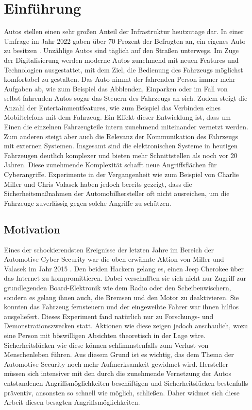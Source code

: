 \chapter{Einführung}

Autos stellen einen sehr großen Anteil der Infrastruktur heutzutage dar. In einer Umfrage im Jahr 2022 gaben über 70 Prozent der Befragten an, ein eigenes Auto zu besitzen \cite[vgl.][]{Statista.2022}. Unzählige Autos sind täglich auf den Straßen unterwegs. Im Zuge der Digitalisierung werden moderne Autos zunehmend mit neuen Features und Technologien ausgestattet, mit dem Ziel, die Bedienung des Fahrzeugs möglichst komfortabel zu gestalten. Das Auto nimmt der fahrenden Person immer mehr Aufgaben ab, wie zum Beispiel das Abblenden, Einparken oder im Fall von selbst-fahrenden Autos sogar das Steuern des Fahrzeugs an sich. Zudem steigt die Anzahl der Entertainmentfeatures, wie zum Beispiel das Verbinden eines Mobiltelefons mit dem Fahrzeug. Ein Effekt dieser Entwicklung ist, dass um Einen die einzelnen Fahrzeugteile intern zunehmend miteinander vernetzt werden. Zum anderen steigt aber auch die Relevanz der Kommunikation des Fahrzeugs mit externen Systemen. Insgesamt sind die elektronischen Systeme in heutigen Fahrzeugen deutlich komplexer und bieten mehr Schnittstellen als noch vor 20 Jahren. Diese zunehmende Komplexität schafft neue Angriffsflächen für Cyberangriffe. Experimente in der Vergangenheit wie zum Beispiel von Charlie Miller und Chris Valasek \cite[vgl.][]{Greenberg.2015} haben jedoch bereits gezeigt, dass die Sicherheitsmaßnahmen der Automobilhersteller oft nicht ausreichen, um die Fahrzeuge zuverlässig gegen solche Angriffe zu schützen.

\section{Motivation}
Eines der schockierendsten Ereignisse der letzten Jahre im Bereich der Automotive Cyber Security war die oben erwähnte Aktion von Miller und Valasek im Jahr 2015 \cite[vgl.][]{Greenberg.2015}. Den beiden Hackern gelang es, einen Jeep Cherokee über das Internet zu kompromittieren. Dabei verschafften sie sich nicht nur Zugriff zur grundlegenden Board-Elektronik wie dem Radio oder den Scheibenwischern, sondern es gelang ihnen auch, die Bremsen und den Motor zu deaktivieren. Sie konnten das Fahrzeug fernsteuern und der eingeweihte Fahrer war ihnen hilflos ausgeliefert. Dieses Experiment fand natürlich nur zu Forschungs- und Demonstrationszwecken statt. Aktionen wie diese zeigen jedoch anschaulich, wozu eine Person mit böswilligen Absichten theoretisch in der Lage wäre. Sicherheitslücken wie diese können schlimmstenfalls zum Verlust von Menschenleben führen. Aus diesem Grund ist es wichtig, das dem Thema der Automotive Security noch mehr Aufmerksamkeit gewidmet wird. Hersteller müssen sich intensiver mit den durch die zunehmende Vernetzung der Autos entstandenen Angriffsmöglichkeiten beschäftigen und Sicherheitslücken bestenfalls präventiv, ansonsten so schnell wie möglich, schließen. Daher widmet sich diese Arbeit diesen besagten Angriffsmöglichkeiten.

